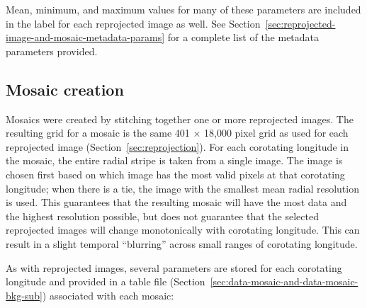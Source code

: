 Mean, minimum, and maximum values for many of these parameters are included in the label for each reprojected image as well. See Section~\ref{sec:reprojected-image-and-mosaic-metadata-params} for a complete list of the metadata parameters provided.


\subsection{Mosaic creation}
\label{sec:mosaic-creation}

Mosaics were created by stitching together one or more reprojected images. The resulting grid for a mosaic is the same 401 × 18,000 pixel grid as used for each reprojected image (Section~\ref{sec:reprojection}). For each corotating longitude in the mosaic, the entire radial stripe is taken from a single image. The image is chosen first based on which image has the most valid pixels at that corotating longitude; when there is a tie, the image with the smallest mean radial resolution is used. This guarantees that the resulting mosaic will have the most data and the highest resolution possible, but does not guarantee that the selected reprojected images will change monotonically with corotating longitude. This can result in a slight temporal “blurring” across small ranges of corotating longitude.

As with reprojected images, several parameters are stored for each corotating longitude and provided in a table file  (Section~\ref{sec:data-mosaic-and-data-mosaic-bkg-sub}) associated with each mosaic:

